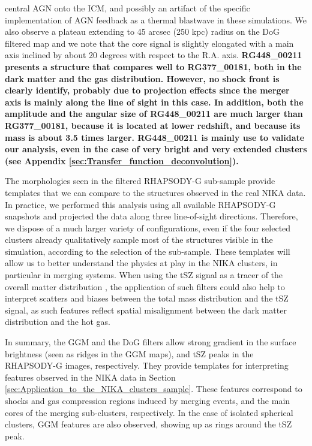 \documentclass[twocolumn,traditabstract]{aa}
\begin{document}
central AGN onto the ICM, and possibly an artifact of the specific implementation of AGN feedback as a thermal blastwave in these simulations. We also observe a plateau extending to 45 arcsec (250 kpc) radius on the DoG filtered map and we note that the core signal is slightly elongated with a main axis inclined by about 20 degrees with respect to the R.A. axis. {\bf RG448\_00211 presents a structure that compares well to RG377\_00181, both in the dark matter and the gas distribution. However, no shock front is clearly identify, probably due to projection effects since the merger axis is mainly along the line of sight in this case. In addition, both the amplitude and the angular size of RG448\_00211 are much larger than RG377\_00181, because it is located at lower redshift, and because its mass is about 3.5 times larger. RG448\_00211 is mainly use to validate our analysis, even in the case of very bright and very extended clusters (see Appendix \ref{sec:Transfer_function_deconvolution}).}

The morphologies seen in the filtered RHAPSODY-G sub-sample provide templates that we can compare to the structures observed in the real NIKA data. In practice, we performed this analysis using all available RHAPSODY-G snapshots and projected the data along three line-of-sight directions. Therefore, we dispose of a much larger variety of configurations, even if the four selected clusters already qualitatively sample most of the structures visible in the simulation, according to the selection of the sub-sample. These templates will allow us to better understand the physics at play in the NIKA clusters, in particular in merging systems. When using the tSZ signal as a tracer of the overall matter distribution \citep[e.g.][]{Adam2015,Adam2016a,Ruppin2016}, the application of such filters could also help to interpret scatters and biases between the total mass distribution and the tSZ signal, as such features reflect spatial misalignment between the dark matter distribution and the hot gas.

In summary, the GGM and the DoG filters allow strong gradient in the surface brightness (seen as ridges in the GGM maps), and tSZ peaks in the RHAPSODY-G images, respectively. They provide templates for interpreting features observed in the NIKA data in Section \ref{sec:Application_to_the_NIKA_clusters_sample}. These features correspond to shocks and gas compression regions induced by merging events, and the main cores of the merging sub-clusters, respectively. In the case of isolated spherical clusters, GGM features are also observed, showing up as rings around the tSZ peak.
\end{document}
